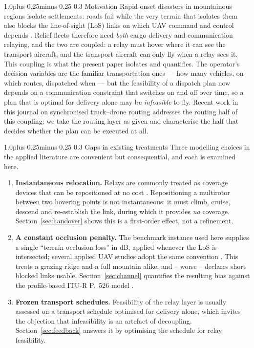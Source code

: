 \documentclass[11pt]{article}
\makeatletter
\def\subsection{\@startsection{subsection}{2}{\z@}%
    {1.0\baselineskip plus 0.25\baselineskip minus 0.25\baselineskip}%
    {0.3\baselineskip}%
    {\normalfont\normalsize\itshape}}%
\theoremstyle{dshplain}
\theoremstyle{dshdefn}
\makeatother
\begin{document}
\subsection{Motivation}
Rapid-onset disasters in mountainous regions isolate settlements: roads fail
while the very terrain that isolates them also blocks the line-of-sight (LoS)
links on which UAV command and control depends \cite{sheu2007,caunhye2012,
erdelj,otto2018}. Relief fleets therefore need \emph{both} cargo delivery
and communication relaying, and the two are coupled: a relay must hover where it
can see the transport aircraft, and the transport aircraft can only fly when a
relay sees it. This coupling is what the present paper isolates and quantifies.
The operator's decision variables are the familiar transportation ones --- how
many vehicles, on which routes, dispatched when --- but the feasibility of a
dispatch plan now depends on a communication constraint that switches on and
off over time, so a plan that is optimal for delivery alone may be
\emph{infeasible} to fly. Recent work in this journal on synchronised
truck--drone routing \cite{das2021,bian2024} addresses the routing half of this
coupling; we take the routing layer as given and characterise the half that
decides whether the plan can be executed at all.

\subsection{Gaps in existing treatments}
Three modelling choices in the applied literature are convenient but
consequential, and each is examined here.
\begin{enumerate}[leftmargin=1.5em,itemsep=2pt]
\item \textbf{Instantaneous relocation.} Relays are commonly treated as
  coverage devices that can be repositioned at no cost
  \cite{zeng,mozaffari,zengtraj,alhourani2014,hourani2016}. Repositioning a
  multirotor between two hovering points is not instantaneous: it must climb,
  cruise, descend and re-establish the link, during which it provides
  \emph{no} coverage. Section~\ref{sec:handover} shows this is a first-order
  effect, not a refinement.
\item \textbf{A constant occlusion penalty.} The benchmark instance used here
  supplies a single ``terrain occlusion loss'' in dB, applied whenever the LoS
  is intersected; several applied UAV studies adopt the same convention
  \cite{matolak,alhourani2014}. This treats a grazing ridge and a full mountain alike, and
  -- worse -- declares short blocked links usable. Section~\ref{sec:channel}
  quantifies the resulting bias against the profile-based ITU-R P.~526 model
  \cite{iturp526,deygout,matolak}.
\item \textbf{Frozen transport schedules.} Feasibility of the relay layer is
  usually assessed on a transport schedule optimised for delivery alone, which
  invites the objection that infeasibility is an artefact of decoupling.
  Section~\ref{sec:feedback} answers it by optimising the schedule for relay
  feasibility.
\end{enumerate}
\end{document}

